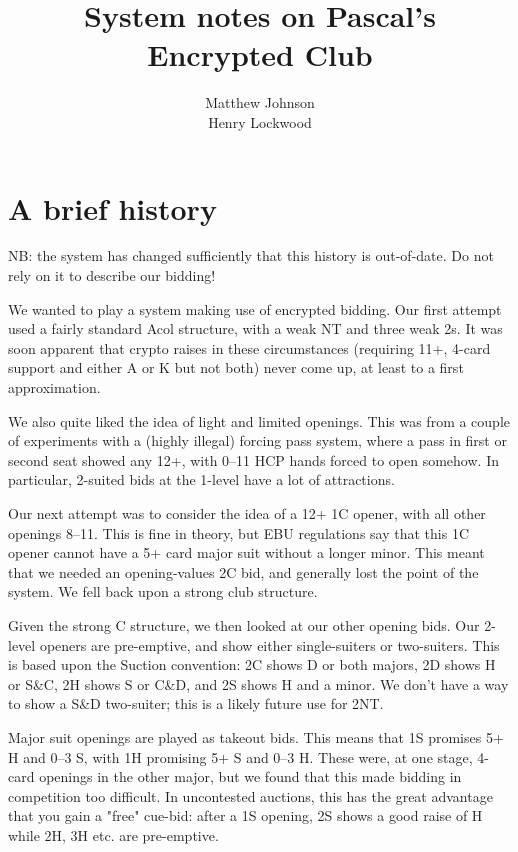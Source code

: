 \documentclass[a4paper,12pt]{article}
\author{Matthew Johnson\\Henry Lockwood}
\title{System notes on Pascal's Encrypted Club}
\begin{document}
\maketitle

\section{A brief history}

NB: the system has changed sufficiently that this history is out-of-date.  Do
not rely on it to describe our bidding!

We wanted to play a system making use of encrypted bidding.  Our first attempt
used a fairly standard Acol structure, with a weak NT and three weak 2s.  It
was soon apparent that crypto raises in these circumstances (requiring 11+,
4-card support and either A or K but not both) never come up, at least to a
first approximation.

We also quite liked the idea of light and limited openings.  This was from a
couple of experiments with a (highly illegal) forcing pass system, where a pass
in first or second seat showed any 12+, with 0--11 HCP hands forced to open
somehow.  In particular, 2-suited bids at the 1-level have a lot of
attractions.

Our next attempt was to consider the idea of a 12+ 1C opener, with all other
openings 8--11.  This is fine in theory, but EBU regulations say that this 1C
opener cannot have a 5+ card major suit without a longer minor.  This meant
that we needed an opening-values 2C bid, and generally lost the point of the
system.  We fell back upon a strong club structure.

Given the strong C structure, we then looked at our other opening bids.  Our
2-level openers are pre-emptive, and show either single-suiters or two-suiters.
This is based upon the Suction convention: 2C shows D or both majors, 2D shows
H or S\&C, 2H shows S or C\&D, and 2S shows H and a minor.  We don't have a way
to show a S\&D two-suiter; this is a likely future use for 2NT.

Major suit openings are played as takeout bids.  This means that 1S promises 5+
H and 0--3 S, with 1H promising 5+ S and 0--3 H.  These were, at one stage,
4-card openings in the other major, but we found that this made bidding in
competition too difficult.  In uncontested auctions, this has the great
advantage that you gain a "free" cue-bid: after a 1S opening, 2S shows a good
raise of H while 2H, 3H etc. are pre-emptive.
\end{document}
